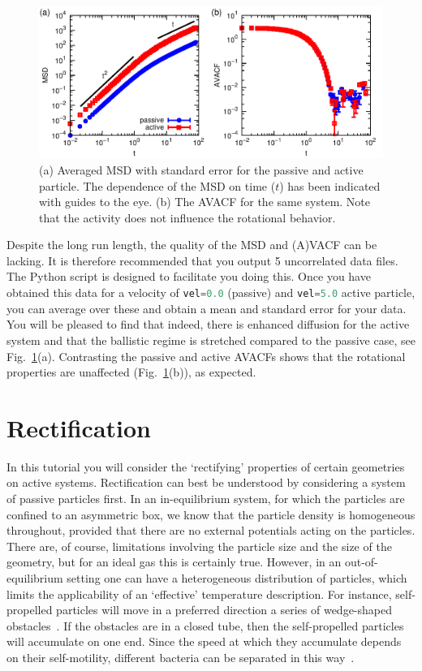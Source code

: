 \documentclass[aip,jcp,reprint,a4paper,onecolumn,amsmath]{revtex4-1}
\newcommand\codees{\lstinline[language=python]}
\begin{document}
\begin{figure}[!htb]
\begin{center}
\includegraphics[scale=0.75]{FIGURES/enhanced}
\end{center}
\caption{\label{fig:enhanced}(a) Averaged MSD with standard error for the
passive and active particle. The dependence of the MSD on time ($t$) has been
indicated with guides to the eye. (b) The AVACF for the same system. Note that
the activity does not influence the rotational behavior.}
\end{figure}

Despite the long run length, the quality of the MSD and (A)VACF can be lacking.
It is therefore recommended that you output 5 uncorrelated data files. The
Python script is designed to facilitate you doing this. Once you have obtained
this data for a velocity of \codees{vel=0.0} (passive) and \codees{vel=5.0}
active particle, you can average over these and obtain a mean and standard
error for your data. You will be pleased to find that indeed, there is enhanced
diffusion for the active system and that the ballistic regime is stretched
compared to the passive case, see Fig.~\ref{fig:enhanced}(a). Contrasting the
passive and active AVACFs shows that the rotational properties are unaffected
(Fig.~\ref{fig:enhanced}(b)), as expected.

\section{\label{sec:rectify}Rectification}

In this tutorial you will consider the `rectifying' properties of certain
geometries on active systems. Rectification can best be understood by
considering a system of passive particles first. In an in-equilibrium system,
for which the particles are confined to an asymmetric box, we know that the
particle density is homogeneous throughout, provided that there are no external
potentials acting on the particles. There are, of course, limitations involving
the particle size and the size of the geometry, but for an ideal gas this is
certainly true. However, in an out-of-equilibrium setting one can have a
heterogeneous distribution of particles, which limits the applicability of an
`effective' temperature description. For instance, self-propelled particles
will move in a preferred direction a series of wedge-shaped
obstacles~\cite{Berdakin13a}. If the obstacles are in a closed tube, then the
self-propelled particles will accumulate on one end. Since the speed at which
they accumulate depends on their self-motility, different bacteria can be
separated in this way~\cite{Berdakin13b}.
\end{document}
